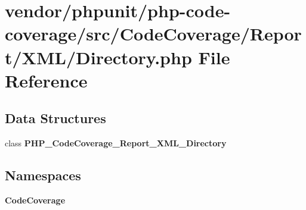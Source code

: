 \section{vendor/phpunit/php-\/code-\/coverage/src/\+Code\+Coverage/\+Report/\+X\+M\+L/\+Directory.php File Reference}
\label{phpunit_2php-code-coverage_2src_2_code_coverage_2_report_2_x_m_l_2_directory_8php}
\subsection*{Data Structures}
\begin{DoxyCompactItemize}
\item 
class {\bf P\+H\+P\+\_\+\+Code\+Coverage\+\_\+\+Report\+\_\+\+X\+M\+L\+\_\+\+Directory}
\end{DoxyCompactItemize}
\subsection*{Namespaces}
\begin{DoxyCompactItemize}
\item 
 {\bf Code\+Coverage}
\end{DoxyCompactItemize}
